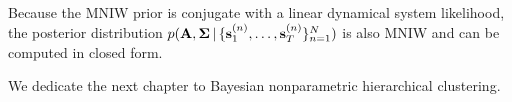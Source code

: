 Because the MNIW prior is conjugate
with a linear dynamical system likelihood,
the posterior distribution $p(\mathbf{A}, \bm{\Sigma} \,|\, \{\mathbf{s}_1^{(n)}, \ldots, \mathbf{s}_{T}^{(n)}\}_{n = 1}^{N})$ is also MNIW
and can be computed in closed form.


We dedicate the next chapter to
Bayesian nonparametric hierarchical clustering.









